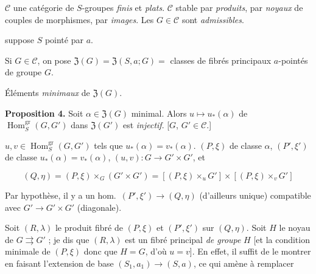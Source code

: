 \documentclass[11pt,a4paper]{article}
\begin{document}
$\mathcal{C}$ une catégorie de $S$-groupes \emph{finis} et \emph{plats}.
$\mathcal{C}$ stable par \emph{produits},  par \emph{noyaux}
\struck{\ill{}} de couples de morphismes, par \emph{images}. Les $G \in
\mathcal{C}$ sont \emph{admissibles}.

 \struck{\ill{}} suppose $S$ pointé par $a$.

Si $G \in \mathcal{C}$, on pose $\mathfrak{Z}(G) = \mathfrak{Z}(S, a ; G) = $
classes de fibrés principaux  $a$-pointés de groupe $G$.

Éléments \emph{minimaux} de $\mathfrak{Z}(G)$.

\textbf{Proposition 4.} Soit $\alpha \in \mathfrak{Z}(G)$ minimal. Alors $u
\mapsto u_{*}(\alpha)$ de $\operatorname{Hom}^{\mathrm{gr}}_{S}(G, G')$ dans
$\mathfrak{Z}(G')$ est \emph{injectif}. [$G$, $G' \in \mathcal{C}$.]

$u, v \in \operatorname{Hom}^{\mathrm{gr}}_{S}(G, G')$ tels que
\struck{\ill{}} $u_{*}(\alpha) = v_{*}(\alpha)$. $(P, \xi)$ de classe $\alpha$,
$(P', \xi')$ de classe $u_{*}(\alpha) = v_{*}(\alpha)$, $(u,v) : G \to G'
\times G'$, et

\[ (Q, \eta) = (P, \xi) \times_{G} (G' \times G') = [(P, \xi) \times_{u} G']
\times [(P, \xi) \times_{v} G'] \]

Par hypothèse, il y a un hom.\ $(P', \xi') \to (Q, \eta)$ (d'ailleurs unique)
compatible avec $G' \to G' \times G'$ (diagonale).




Soit $(R, \lambda)$ le produit fibré de $(P, \xi)$ et $(P', \xi')$ sur $(Q,
\eta)$. \struck{\ill{}} Soit $H$ le noyau de $G \rightrightarrows G'$ ; je dis que
$(R, \lambda)$ est un fibré principal \emph{de groupe} $H$ [et
la condition minimale de $(P, \xi)$  donc que $H = G$, d'où $u = v$].
En effet, il suffit de le montrer  en faisant l'extension de
base $(S_{1}, a_{1}) \to (S, a)$, ce qui amène à remplacer %

\end{document}
